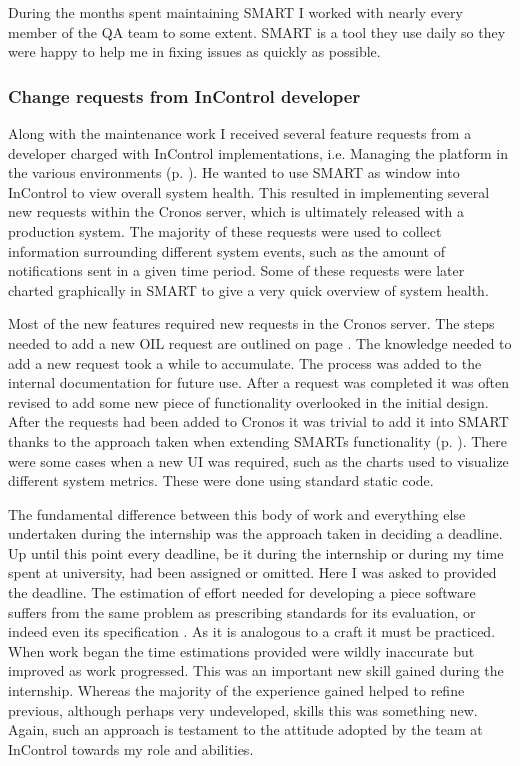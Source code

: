 \documentclass[a4paper, 11pt, titlepage]{article}
\begin{document}
During the months spent maintaining SMART I worked with nearly every member of the QA team to some extent. SMART is a tool they use daily so they were happy to help me in fixing issues as quickly as possible. 
 
\subsubsection{Change requests from InControl developer} 
Along with the maintenance work I received several feature requests from a developer charged with InControl implementations, i.e. Managing the platform in the various environments (p. \pageref{release_environments}). He wanted to use SMART as window into InControl to view overall system health. This resulted in implementing several new requests within the Cronos server, which is ultimately released with a production system. The majority of these requests were used to collect information surrounding different system events, such as the amount of notifications sent in a given time period. Some of these requests were later charted graphically in SMART to give a very quick overview of system health. 

Most of the new features required new requests in the Cronos server. The steps needed to add a new OIL request are outlined on page \pageref{OIL}. The knowledge needed to add a new request took a while to accumulate. The process was added to the internal documentation for future use. After a request was completed it was often revised to add some new piece of functionality overlooked in the initial design. After the requests had been added to Cronos it was trivial to add it into SMART thanks to the approach taken when extending SMARTs functionality (p. \pageref{dynamic_smart}). There were some cases when a new UI was required, such as the charts used to visualize different system metrics. These were done using standard static code.

The fundamental difference between this body of work and everything else undertaken during the internship was the approach taken in deciding a deadline. Up until this point every deadline, be it during the internship or during my time spent at university, had been assigned or omitted. Here I was asked to provided the deadline. The estimation of effort needed for developing a piece software suffers from the same problem as prescribing standards for its evaluation, or indeed even its specification \cite{NoBullet} \cite{cMellonTest}. As it is analogous to a craft it must be practiced. When work began the time estimations provided were wildly inaccurate but improved as work progressed. This was an important new skill gained during the internship. Whereas the majority of the experience gained helped to refine previous, although perhaps very undeveloped, skills this was something new. Again, such an approach is testament to the attitude adopted by the team at InControl towards my role and abilities.
\end{document}
